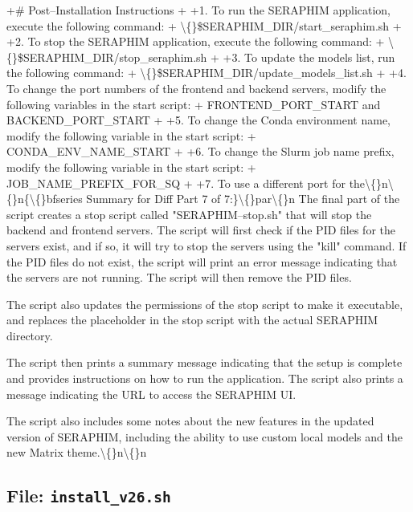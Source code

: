\documentclass{article}
\begin{document}
{+\# Post--Installation Instructions
+
+1. To run the SERAPHIM application, execute the following command:
+   \textbackslash\{\}\$SERAPHIM\_DIR/start\_seraphim.sh
+
+2. To stop the SERAPHIM application, execute the following command:
+   \textbackslash\{\}\$SERAPHIM\_DIR/stop\_seraphim.sh
+
+3. To update the models list, run the following command:
+   \textbackslash\{\}\$SERAPHIM\_DIR/update\_models\_list.sh
+
+4. To change the port numbers of the frontend and backend servers, modify the following variables in the start script:
+   FRONTEND\_PORT\_START and BACKEND\_PORT\_START
+
+5. To change the Conda environment name, modify the following variable in the start script:
+   CONDA\_ENV\_NAME\_START
+
+6. To change the Slurm job name prefix, modify the following variable in the start script:
+   JOB\_NAME\_PREFIX\_FOR\_SQ
+
+7. To use a different port for the\textbackslash\{\}n\textbackslash\{\}n\{\textbackslash\{\}bfseries Summary for Diff Part 7 of 7:\}\textbackslash\{\}par\textbackslash\{\}n  The final part of the script creates a stop script called "SERAPHIM--stop.sh" that will stop the backend and frontend servers. The script will first check if the PID files for the servers exist, and if so, it will try to stop the servers using the "kill" command. If the PID files do not exist, the script will print an error message indicating that the servers are not running. The script will then remove the PID files.

The script also updates the permissions of the stop script to make it executable, and replaces the placeholder in the stop script with the actual SERAPHIM directory.

The script then prints a summary message indicating that the setup is complete and provides instructions on how to run the application. The script also prints a message indicating the URL to access the SERAPHIM UI.

The script also includes some notes about the new features in the updated version of SERAPHIM, including the ability to use custom local models and the new Matrix theme.\textbackslash\{\}n\textbackslash\{\}n\n}\n\n\subsection{File: \texttt{install\_v26.sh}}
\end{document}
